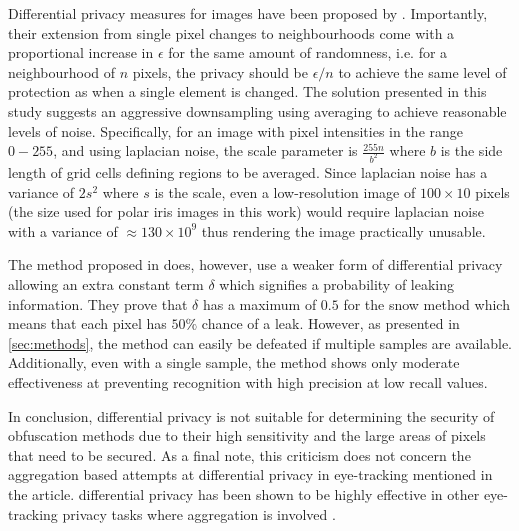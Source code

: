 Differential privacy measures for images have been proposed by \parencite{fan2018image}. Importantly, their extension from single pixel changes to neighbourhoods come with a proportional increase in $\epsilon$ for the same amount of randomness, i.e. for a neighbourhood of $n$ pixels, the privacy should be $\epsilon/n$ to achieve the same level of protection as when a single element is changed. The solution presented in this study suggests an aggressive downsampling using averaging to achieve reasonable levels of noise. Specifically, for an image with pixel intensities in the range $0-255$, and using laplacian noise, the scale parameter is $\frac{255n}{b^2}$ where $b$ is the side length of grid cells defining regions to be averaged. Since laplacian noise has a variance of $2s^2$ where $s$ is the scale, even a low-resolution image of $100\times 10$ pixels (the size used for polar iris images in this work) would require laplacian noise with a variance of $\approx 130\times 10^9$ thus rendering the image practically unusable.

The method proposed in \parencite{BRENDAN_SNOW} does, however, use a weaker form of differential privacy allowing an extra constant term $\delta$ which signifies a probability of leaking information. They prove that $\delta$ has a maximum of $0.5$ for the snow method which means that each pixel has $50\%$ chance of a leak. However, as presented in \cref{sec:methods}, the method can easily be defeated if multiple samples are available. Additionally, even with a single sample, the method shows only moderate effectiveness at preventing recognition with high precision at low recall values. 

In conclusion, differential privacy is not suitable for determining the security of obfuscation methods due to their high sensitivity and the large areas of pixels that need to be secured. As a final note, this criticism does not concern the aggregation based attempts at differential privacy in eye-tracking mentioned in the article. %
 differential privacy has been shown to be highly effective in other eye-tracking privacy tasks where aggregation is involved \parencite{differential-general, differential-general-two}.



